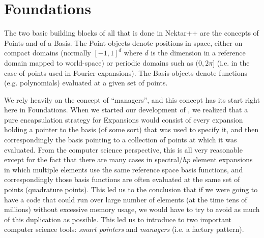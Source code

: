 %
\section{Foundations}
The two basic building blocks of all that is done in Nektar++ are the concepts of Points and of a Basis.  The Point objects denote positions
in space, either on compact domains (normally $[-1,1]^d$ where $d$ is the dimension in a reference domain mapped to world-space) 
or periodic domains such as $(0,2\pi]$ (i.e. in the case of points used in Fourier expansions).   
The Basis objects denote functions (e.g. polynomials) evaluated at a given set of points.

We rely heavily on the concept of ``managers'', and this concept has its start right here in Foundations.  When we started our development of
{\nek}, we realized that a pure encapsulation strategy for Expansions would consist of every expansion holding a pointer to the basis (of some sort)
that was used to specify it, and then correspondingly the basis pointing to a collection of points at which it was evaluated.  From the computer
science perspective, this is all very reasonable except for the fact that there are many cases in spectral/$hp$ element expansions in which
multiple elements use the same reference space basis functions, and correspondingly those basis functions are often evaluated at the same
set of points (quadrature points).  This led us to the conclusion that if we were going to have a code that could run over large number of elements
(at the time tens of millions) without excessive memory usage, we would have to try to avoid as much of this duplication as possible.  This led us
to introduce to {\nek} two important computer science tools:  {\em smart pointers} and {\em managers} (i.e. a factory pattern).  

